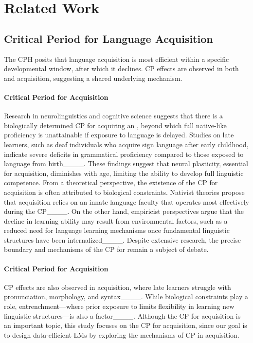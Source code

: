 \section{Related Work}
\subsection{Critical Period for Language Acquisition}
\label{subsec:cp}

The CPH posits that language acquisition is most efficient within a specific developmental window, after which it declines. 
CP effects are observed in both \lone and \ltwo acquisition, suggesting a shared underlying mechanism. 


\paragraph{Critical Period for \lone Acquisition}
Research in neurolinguistics and cognitive science suggests that there is a biologically determined CP for acquiring an \lone, beyond which full native-like proficiency is unattainable if exposure to language is delayed. 
Studies on late \lone learners, such as deaf individuals who acquire sign language after early childhood, indicate severe deficits in grammatical proficiency compared to those exposed to language from birth____. 
These findings suggest that neural plasticity, essential for \lone acquisition, diminishes with age, limiting the ability to develop full linguistic competence.
From a theoretical perspective, the existence of the CP for \lone acquisition is often attributed to biological constraints. 
Nativist theories propose that \lone acquisition relies on an innate language faculty that operates most effectively during the CP____. 
On the other hand, empiricist perspectives argue that the decline in \lone learning ability may result from environmental factors, such as a reduced need for language learning mechanisms once fundamental linguistic structures have been internalized____. 
Despite extensive research, the precise boundary and mechanisms of the CP for \lone remain a subject of debate.




\paragraph{Critical Period for \ltwo Acquisition}
CP effects are also observed in \ltwo acquisition, where late learners struggle with pronunciation, morphology, and syntax____. 
While biological constraints play a role, entrenchment—where prior exposure to \lone limits flexibility in learning new linguistic structures—is also a factor____. 
Although the CP for \ltwo acquisition is an important topic, this study focuses on the CP for \lone acquisition, since our goal is to design data-efficient LMs by exploring the mechanisms of CP in \lone acquisition.






